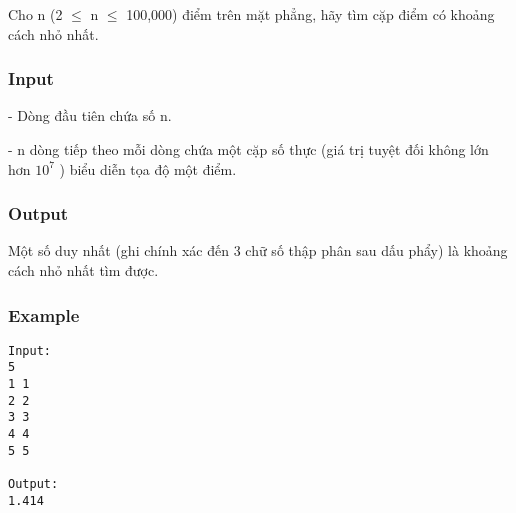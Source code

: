 



   Cho n (2  $\le$  n  $\le$  100,000) điểm trên mặt phẳng, hãy tìm cặp điểm có khoảng cách nhỏ nhất.  

\subsubsection{   Input  }

   - Dòng đầu tiên chứa số n.  

   - n dòng tiếp theo mỗi dòng chứa một cặp số thực (giá trị tuyệt đối không lớn hơn $10^{7}$   ) biểu diễn tọa độ một điểm.  

\subsubsection{   Output  }

   Một số duy nhất (ghi chính xác đến 3 chữ số thập phân sau dấu phẩy) là khoảng cách nhỏ nhất tìm được.  

\subsubsection{   Example  }
\begin{verbatim}
Input:
5
1 1
2 2
3 3
4 4
5 5

Output:
1.414
\end{verbatim}
